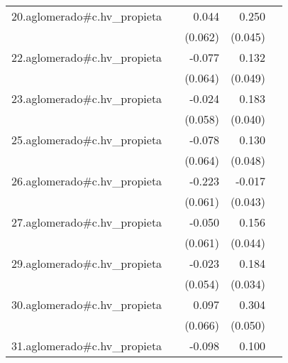 {\begin{longtable}{l*{4}{D{.}{.}{-1}}}
\addlinespace
20.aglomerado#c.hv\_propieta&                     &       0.044         &       0.250\sym{***}&                     \\
            &                     &     (0.062)         &     (0.045)         &                     \\
\addlinespace
22.aglomerado#c.hv\_propieta&                     &      -0.077         &       0.132\sym{**} &                     \\
            &                     &     (0.064)         &     (0.049)         &                     \\
\addlinespace
23.aglomerado#c.hv\_propieta&                     &      -0.024         &       0.183\sym{***}&                     \\
            &                     &     (0.058)         &     (0.040)         &                     \\
\addlinespace
25.aglomerado#c.hv\_propieta&                     &      -0.078         &       0.130\sym{**} &                     \\
            &                     &     (0.064)         &     (0.048)         &                     \\
\addlinespace
26.aglomerado#c.hv\_propieta&                     &      -0.223\sym{***}&      -0.017         &                     \\
            &                     &     (0.061)         &     (0.043)         &                     \\
\addlinespace
27.aglomerado#c.hv\_propieta&                     &      -0.050         &       0.156\sym{***}&                     \\
            &                     &     (0.061)         &     (0.044)         &                     \\
\addlinespace
29.aglomerado#c.hv\_propieta&                     &      -0.023         &       0.184\sym{***}&                     \\
            &                     &     (0.054)         &     (0.034)         &                     \\
\addlinespace
30.aglomerado#c.hv\_propieta&                     &       0.097         &       0.304\sym{***}&                     \\
            &                     &     (0.066)         &     (0.050)         &                     \\
\addlinespace
31.aglomerado#c.hv\_propieta&                     &      -0.098         &       0.100         &                     \\

\end{longtable}}
